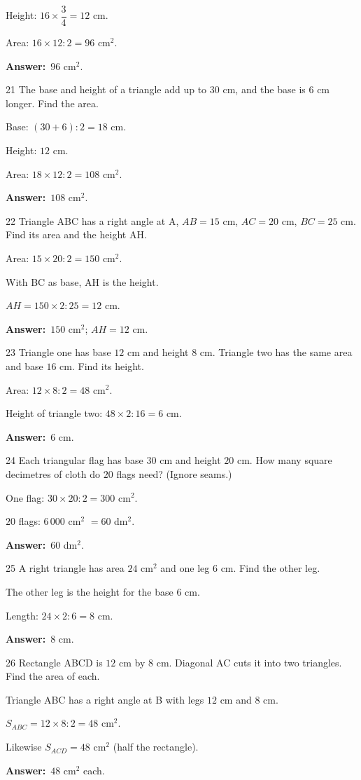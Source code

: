 \documentclass[11pt]{article}
\newif\ifsol \solfalse
\providecommand{\AnsWord}{Đáp số}
\newcommand{\dapso}[1]{\par\textbf{\AnsWord:}\ #1}
\newcommand{\probsol}[1]{%
  \begin{lrbox}{\solmeasure}\begin{minipage}{\dimexpr\linewidth-24pt\relax}#1\end{minipage}\end{lrbox}%
  \ifsol
    \begin{solbox}#1\end{solbox}%
  \else
    \setlength{\solht}{\dimexpr\ht\solmeasure+\dp\solmeasure+0.85cm\relax}%
    \ifdim\solht<1.35cm\setlength{\solht}{1.35cm}\fi
    \begin{tcolorbox}[colback=white,colframe=Line,boxrule=0.8pt,arc=5pt,
      left=8pt,right=8pt,top=4pt,bottom=4pt,height=\solht]{\footnotesize\color{Slate}\itshape\WorkWord}\end{tcolorbox}%
  \fi}
\newcommand{\gap}{\vspace{0.3cm}}
\def\WorkWord{Your work:}
\def\AnsWord{Answer}
\begin{document}
\probsol{
Height: $16\times\dfrac34=12$ cm.\par Area: $16\times12:2=96$ cm$^2$.
\dapso{$96$ cm$^2$.}}
\gap
\begin{probbox}{21}{\relax}
The base and height of a triangle add up to $30$ cm, and the base is $6$ cm longer. Find the area.
\end{probbox}
\probsol{
Base: $(30+6):2=18$ cm.\par Height: $12$ cm.\par Area: $18\times12:2=108$ cm$^2$.
\dapso{$108$ cm$^2$.}}
\gap
\begin{probbox}{22}{\relax}
Triangle ABC has a right angle at A, $AB=15$ cm, $AC=20$ cm, $BC=25$ cm. Find its area and the height AH.
\end{probbox}
\probsol{
Area: $15\times20:2=150$ cm$^2$.\par With BC as base, AH is the height.\par $AH=150\times2:25=12$ cm.
\dapso{$150$ cm$^2$; $AH=12$ cm.}}
\gap
\begin{probbox}{23}{\relax}
Triangle one has base $12$ cm and height $8$ cm. Triangle two has the same area and base $16$ cm. Find its height.
\end{probbox}
\probsol{
Area: $12\times8:2=48$ cm$^2$.\par Height of triangle two: $48\times2:16=6$ cm.
\dapso{$6$ cm.}}
\gap
\begin{probbox}{24}{\relax}
Each triangular flag has base $30$ cm and height $20$ cm. How many square decimetres of cloth do $20$ flags need? (Ignore seams.)
\end{probbox}
\probsol{
One flag: $30\times20:2=300$ cm$^2$.\par $20$ flags: $6\,000$ cm$^2$ $=60$ dm$^2$.
\dapso{$60$ dm$^2$.}}
\gap
\begin{probbox}{25}{\relax}
A right triangle has area $24$ cm$^2$ and one leg $6$ cm. Find the other leg.
\end{probbox}
\probsol{
The other leg is the height for the base $6$ cm.\par Length: $24\times2:6=8$ cm.
\dapso{$8$ cm.}}
\gap
\begin{probbox}{26}{\relax}
Rectangle ABCD is $12$ cm by $8$ cm. Diagonal AC cuts it into two triangles. Find the area of each.
\end{probbox}
\probsol{
Triangle ABC has a right angle at B with legs $12$ cm and $8$ cm.\par $S_{ABC}=12\times8:2=48$ cm$^2$.\par Likewise $S_{ACD}=48$ cm$^2$ (half the rectangle).
\dapso{$48$ cm$^2$ each.}}
\end{document}
